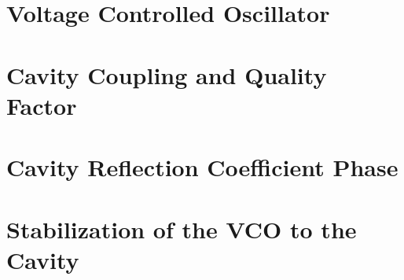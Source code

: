 \documentclass[12pt]{article}
\begin{document}




\section{Voltage Controlled Oscillator}

\newpage
\section{Cavity Coupling and Quality Factor}

\newpage
\section{Cavity Reflection Coefficient Phase}

\newpage
\section{Stabilization of the VCO to the Cavity}

\newpage
\nocite{*}


\end{document}

